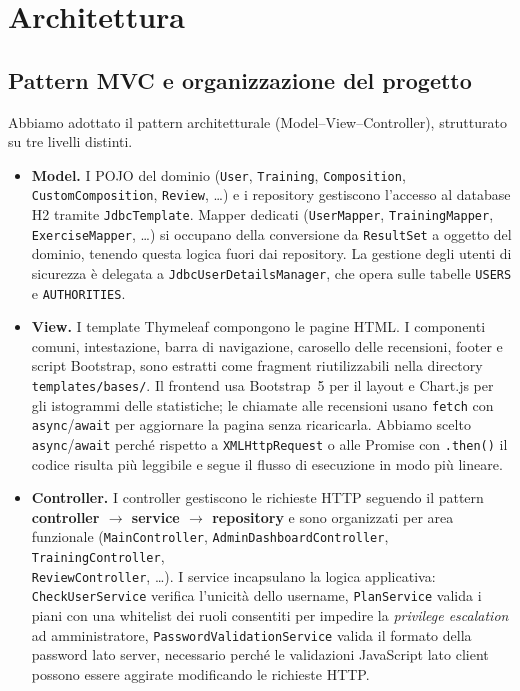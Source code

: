 \section{Architettura}

\subsection{Pattern MVC e organizzazione del progetto}
Abbiamo adottato il pattern architetturale \mvc (Model--View--Controller),
strutturato su tre livelli distinti.

\begin{itemize}
  \item \textbf{Model.} I POJO del dominio (\texttt{User}, \texttt{Training}, \texttt{Composition}, \texttt{CustomComposition}, \texttt{Review}, \ldots) e i repository gestiscono l'accesso al database H2 tramite \texttt{JdbcTemplate}. Mapper dedicati (\texttt{UserMapper}, \texttt{TrainingMapper}, \texttt{ExerciseMapper}, \ldots) si occupano della conversione da \texttt{ResultSet} a oggetto del dominio, tenendo questa logica fuori dai repository. La gestione degli utenti di sicurezza è delegata a \texttt{JdbcUserDetailsManager}, che opera sulle tabelle \texttt{USERS} e \texttt{AUTHORITIES}.

  \item \textbf{View.} I template Thymeleaf compongono le pagine HTML. I componenti comuni, intestazione, barra di navigazione, carosello delle recensioni, footer e script Bootstrap, sono estratti come fragment riutilizzabili nella directory \texttt{templates/bases/}. Il frontend usa Bootstrap~5 per il layout e Chart.js per gli istogrammi delle statistiche; le chiamate alle recensioni usano \texttt{fetch} con \texttt{async}/\texttt{await} per aggiornare la pagina senza ricaricarla. Abbiamo scelto \texttt{async}/\texttt{await} perché rispetto a \texttt{XMLHttpRequest} o alle Promise con \texttt{.then()} il codice risulta più leggibile e segue il flusso di esecuzione in modo più lineare.

  \item \textbf{Controller.} I controller gestiscono le richieste HTTP seguendo il pattern \textbf{controller $\to$ service $\to$ repository} e sono organizzati per area funzionale (\texttt{MainController}, \texttt{AdminDashboardController}, \texttt{TrainingController},\\\texttt{ReviewController}, \ldots). I service incapsulano la logica applicativa: \texttt{CheckUserService} verifica l'unicità dello username, \texttt{PlanService} valida i piani con una whitelist dei ruoli consentiti per impedire la \textit{privilege escalation} ad amministratore, \texttt{PasswordValidationService} valida il formato della password lato server, necessario perché le validazioni JavaScript lato client possono essere aggirate modificando le richieste HTTP.
\end{itemize}

